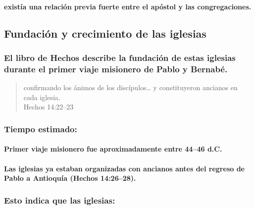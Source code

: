 \documentclass[11a pt,twoside]{article}
\let\oldsubsection\subsection
\renewcommand{\subsection}{\needspace{5\baselineskip}\oldsubsection}
\let\oldsubsubsection\subsubsection
\renewcommand{\subsubsection}{\needspace{4\baselineskip}\oldsubsubsection}
\let\oldparagraph\paragraph
\renewcommand{\paragraph}{\needspace{3\baselineskip}\oldparagraph}
\let\oldcr\\%
\def\\{\oldcr\normalfont}%
\begin{document}
\paragraph{existía una relación previa fuerte entre el apóstol y las
congregaciones.}\label{existuxeda-una-relaciuxf3n-previa-fuerte-entre-el-apuxf3stol-y-las-congregaciones.}

\subsection{Fundación y crecimiento de las
iglesias}\label{fundaciuxf3n-y-crecimiento-de-las-iglesias}

\subsubsection{El libro de Hechos describe la fundación de estas
iglesias durante el primer viaje misionero de Pablo y
Bernabé.}\label{el-libro-de-hechos-describe-la-fundaciuxf3n-de-estas-iglesias-durante-el-primer-viaje-misionero-de-pablo-y-bernabuxe9.}

\begin{quote}
confirmando los ánimos de los discípulos\ldots{} y constituyeron
ancianos en cada iglesia.\\
Hechos 14:22--23
\end{quote}

\subsubsection{Tiempo estimado:}\label{tiempo-estimado}

\paragraph{Primer viaje misionero fue aproximadamente entre 44--46
d.C.}\label{primer-viaje-misionero-fue-aproximadamente-entre-4446-d.c.}

\paragraph{Las iglesias ya estaban organizadas con ancianos antes del
regreso de Pablo a Antioquía (Hechos
14:26--28).}\label{las-iglesias-ya-estaban-organizadas-con-ancianos-antes-del-regreso-de-pablo-a-antioquuxeda-hechos-142628.}

\subsubsection{Esto indica que las
iglesias:}\label{esto-indica-que-las-iglesias}
\end{document}
